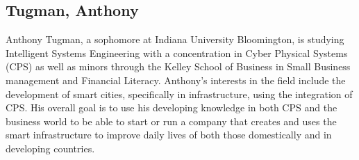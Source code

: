 \subsection{Tugman, Anthony}
Anthony Tugman, a sophomore at Indiana University Bloomington, is studying Intelligent Systems Engineering with a 
concentration in Cyber Physical Systems (CPS) as well as minors through the Kelley School of Business in Small Business 
management and Financial Literacy.  Anthony's interests in the field include the development of smart cities, specifically 
in infrastructure, using the integration of CPS.  His overall goal is to use his developing knowledge in both CPS and the 
business world to be able to start or run a company that creates and uses the smart infrastructure to improve daily lives 
of both those domestically and in developing countries.
